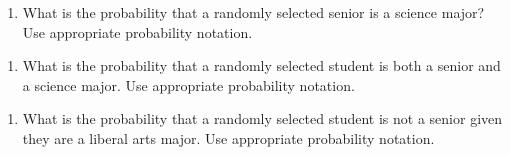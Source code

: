 \documentclass[
]{report}
\providecommand{\tightlist}{%
  \setlength{\itemsep}{0pt}\setlength{\parskip}{0pt}}
\begin{document}
\begin{enumerate}
\def\labelenumi{\alph{enumi}.}
\tightlist
\item
  What is the probability that a randomly selected senior is a science major? Use appropriate probability notation.
\end{enumerate}

\vspace{0.35in}

\begin{enumerate}
\def\labelenumi{\alph{enumi}.}
\setcounter{enumi}{1}
\tightlist
\item
  What is the probability that a randomly selected student is both a senior and a science major. Use appropriate probability notation.
\end{enumerate}

\vspace{0.35in}

\begin{enumerate}
\def\labelenumi{\alph{enumi}.}
\setcounter{enumi}{2}
\tightlist
\item
  What is the probability that a randomly selected student is not a senior given they are a liberal arts major. Use appropriate probability notation.
\end{enumerate}

\vspace{0.35in}
\end{document}
